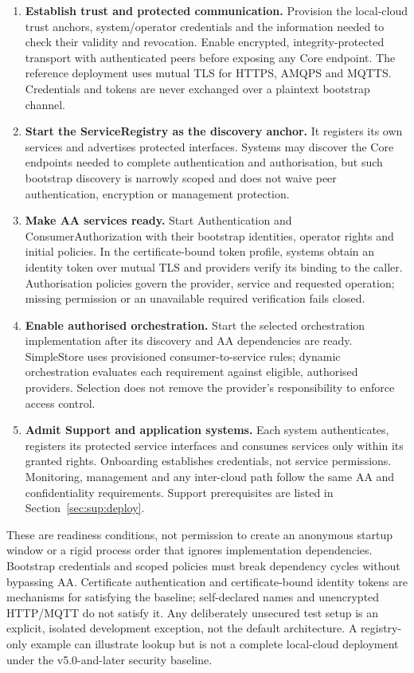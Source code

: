 \documentclass[a4paper]{arrowhead}
\begin{document}
\begin{enumerate}
  \item \textbf{Establish trust and protected communication.} Provision the local-cloud
        trust anchors, system/operator credentials and the information needed to check
        their validity and revocation. Enable encrypted, integrity-protected transport
        with authenticated peers before exposing any Core endpoint. The reference
        deployment uses mutual TLS for HTTPS, AMQPS and MQTTS. Credentials and tokens
        are never exchanged over a plaintext bootstrap channel.
  \item \textbf{Start the ServiceRegistry as the discovery anchor.} It registers its
        own services and advertises protected interfaces. Systems may discover the
        Core endpoints needed to complete authentication and authorisation, but such
        bootstrap discovery is narrowly scoped and does not waive peer authentication,
        encryption or management protection.
  \item \textbf{Make AA services ready.} Start Authentication and
        ConsumerAuthorization with their bootstrap identities, operator rights and
        initial policies. In the certificate-bound token profile, systems obtain an
        identity token over mutual TLS and providers verify its binding to the caller.
        Authorisation policies govern the provider, service and requested operation;
        missing permission or an unavailable required verification fails closed.
  \item \textbf{Enable authorised orchestration.} Start the selected orchestration
        implementation after its discovery and AA dependencies are ready. SimpleStore
        uses provisioned consumer-to-service rules; dynamic orchestration evaluates
        each requirement against eligible, authorised providers. Selection does not
        remove the provider's responsibility to enforce access control.
  \item \textbf{Admit Support and application systems.} Each system authenticates,
        registers its protected service interfaces and consumes services only within
        its granted rights. Onboarding establishes credentials, not service permissions.
        Monitoring, management and any inter-cloud path follow the same AA and
        confidentiality requirements. Support prerequisites are listed in
        Section~\ref{sec:sup:deploy}.
\end{enumerate}

These are readiness conditions, not permission to create an anonymous startup
window or a rigid process order that ignores implementation dependencies.
Bootstrap credentials and scoped policies must break dependency cycles without
bypassing AA. Certificate authentication and certificate-bound identity tokens are
mechanisms for satisfying the baseline; self-declared names and unencrypted
HTTP/MQTT do not satisfy it. Any deliberately unsecured test setup is an explicit,
isolated development exception, not the default architecture. A registry-only
example can illustrate lookup but is not a complete local-cloud deployment under
the v5.0-and-later security baseline.
\end{document}
